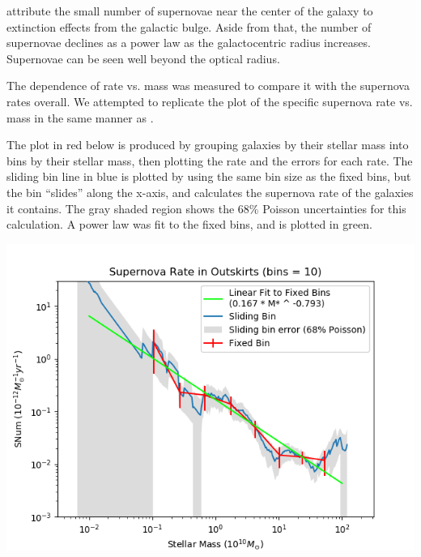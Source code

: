 \documentclass[apj]{emulateapj}
\begin{document}
\citet{Leaman11} attribute the small number of supernovae near the center of the galaxy to extinction effects from the galactic bulge. Aside from that, the number of supernovae declines as a power law as the galactocentric radius increases. Supernovae can be seen well beyond the optical radius.

The dependence of rate vs. mass was measured to compare it with the supernova rates overall. We attempted to replicate the plot of the specific supernova rate vs. mass in the same manner as \citet{Graur17}.

The plot in red below is produced by grouping galaxies by their stellar mass into bins by their stellar mass, then plotting the rate and the errors for each rate. The sliding bin line in blue is plotted by using the same bin size as the fixed bins, but the bin “slides” along the x-axis, and calculates the supernova rate of the galaxies it contains. The gray shaded region shows the 68\% Poisson uncertainties for this calculation. A power law was fit to the fixed bins, and is plotted in green.

\includegraphics[scale=0.5]{outskirts_sn_rate_vs_mass}
\end{document}
